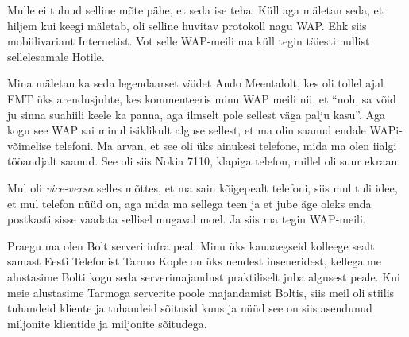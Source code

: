 Mulle ei tulnud selline mõte pähe, et seda ise teha. Küll aga mäletan seda, et 
hiljem kui keegi mäletab, oli selline huvitav protokoll nagu WAP. Ehk siis 
mobiilivariant Internetist. Vot selle WAP-meili ma küll tegin täiesti 
nullist sellelesamale Hotile.


Mina mäletan ka seda legendaarset väidet Ando Meentalolt, kes oli tollel ajal EMT üks arendusjuhte, kes kommenteeris minu WAP 
meili nii, et \enquote{noh, sa võid ju sinna suahiili keele ka panna, aga 
ilmselt pole sellest väga palju kasu}. Aga kogu see WAP sai minul isiklikult 
alguse sellest, et ma olin saanud endale WAPi-võimelise telefoni. Ma arvan, et 
see oli üks ainukesi telefone, mida ma olen iialgi tööandjalt saanud. See oli 
siis Nokia 7110, klapiga telefon, millel oli suur ekraan. 


Mul oli \emph{vice-versa} selles mõttes, et ma sain kõigepealt telefoni, siis 
mul tuli idee, et mul telefon nüüd on, aga mida ma sellega teen  ja et jube äge 
oleks enda postkasti sisse vaadata sellisel mugaval moel.  Ja siis ma tegin 
WAP-meili.


Praegu ma olen Bolt serveri infra peal.  Minu üks kauaaegseid 
kolleege sealt samast Eesti Telefonist Tarmo Kople on 
üks nendest inseneridest, kellega me alustasime Bolti kogu seda 
serverimajandust praktiliselt juba algusest peale. Kui meie alustasime Tarmoga 
serverite poole majandamist Boltis, siis meil oli stiilis tuhandeid kliente ja 
tuhandeid sõitusid kuus ja nüüd see on siis asendunud miljonite klientide ja 
miljonite sõitudega.
